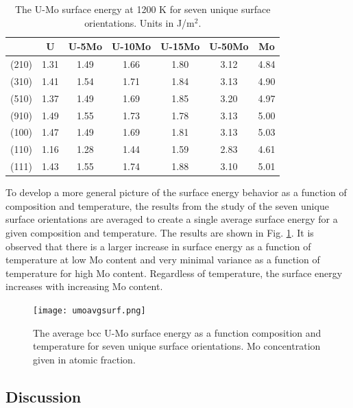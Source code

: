 \documentclass[review]{elsarticle}
\begin{document}
\begin{table}[h]
\caption{The U-Mo surface energy at 1200 K for seven unique surface orientations. Units in J/m$^{2}$.} \label{tab:umosurf1200}
\begin{center}
\begin{tabular}{|c|c|c|c|c|c|c|}
	\hline
 & U & U-5Mo & U-10Mo & U-15Mo & U-50Mo & Mo \\
\hline
(210) & 1.31 & 1.49 & 1.66 & 1.80 & 3.12 & 4.84 \\
(310)	 & 1.41 & 1.54 & 1.71 & 1.84 & 3.13 & 4.90 \\ 
(510)	 & 1.37 & 1.49 & 1.69 & 1.85 & 3.20 & 4.97 \\
(910)	 & 1.49 & 1.55 & 1.73 & 1.78 & 3.13 & 5.00 \\
(100)	 & 1.47 & 1.49 & 1.69 & 1.81 & 3.13 & 5.03 \\
(110)	 & 1.16 & 1.28 & 1.44 & 1.59 & 2.83 & 4.61 \\
(111)	 & 1.43 & 1.55 & 1.74 & 1.88 & 3.10 & 5.01 \\
 	 \hline
\end{tabular}
\end{center}
\label{default}
\end{table}



\FloatBarrier

To develop a more general picture of the surface energy behavior as a function of composition and temperature, the results from the study of the seven unique surface orientations are averaged to create a single average surface energy for a given composition and temperature. The results are shown in Fig. \ref{fig:avgvsmoS}. It is observed that there is a larger increase in surface energy as a function of temperature at low Mo content and very minimal variance as a function of temperature for high Mo content. Regardless of temperature, the surface energy increases with increasing Mo content. 

\begin{figure}[h]
 \centering
 \texttt{[image: umoavgsurf.png]} 
 \caption{The average bcc U-Mo surface energy as a function composition and temperature for seven unique surface orientations. Mo concentration given in atomic fraction.}
 \label{fig:avgvsmoS}
\end{figure}

\FloatBarrier

\subsection{Discussion}
\end{document}
